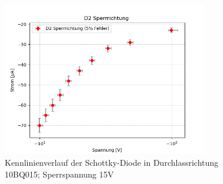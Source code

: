 \documentclass{article}
\theoremstyle{definition}
\begin{document}
\begin{figure}[H]
    \centering
    \includegraphics[width=0.8\textwidth]{figs/dioden_d2_sperr.png}
    \caption{Kennlinienverlauf der Schottky-Diode in Durchlassrichtung 10BQ015; Sperrspannung 15V\cite{anleitung}}
    \label{dioden_d2_sperr}
\end{figure}
\end{document}
